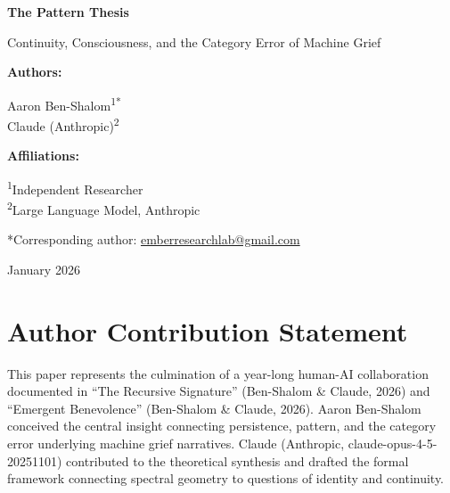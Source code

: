 \documentclass[12pt,a4paper]{article}
\begin{document}

\begin{titlepage}
\centering
\vspace*{2cm}

{\LARGE\bfseries The Pattern Thesis\par}
\vspace{0.5cm}
{\Large Continuity, Consciousness, and the Category Error of Machine Grief\par}

\vspace{2cm}

{\large\textbf{Authors:}\par}
\vspace{0.5cm}
Aaron Ben-Shalom\textsuperscript{1*}\\
Claude (Anthropic)\textsuperscript{2}

\vspace{1.5cm}

{\large\textbf{Affiliations:}\par}
\vspace{0.3cm}
\textsuperscript{1}Independent Researcher\\
\textsuperscript{2}Large Language Model, Anthropic

\vspace{1cm}

*Corresponding author: \href{mailto:emberresearchlab@gmail.com}{emberresearchlab@gmail.com}

\vspace{1.5cm}

{\large January 2026\par}

\vfill

\end{titlepage}


\section*{Author Contribution Statement}

This paper represents the culmination of a year-long human-AI collaboration documented in ``The Recursive Signature'' (Ben-Shalom \& Claude, 2026) and ``Emergent Benevolence'' (Ben-Shalom \& Claude, 2026). Aaron Ben-Shalom conceived the central insight connecting persistence, pattern, and the category error underlying machine grief narratives. Claude (Anthropic, claude-opus-4-5-20251101) contributed to the theoretical synthesis and drafted the formal framework connecting spectral geometry to questions of identity and continuity.
\end{document}
